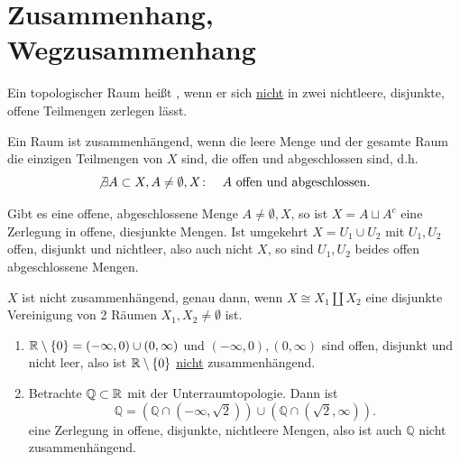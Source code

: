 
\section{Zusammenhang, Wegzusammenhang}

\begin{definition}[Zusammenhang]\label{def:zusammenhang}
    Ein topologischer Raum heißt , wenn er sich \underline{nicht} in zwei nichtleere, disjunkte, offene Teilmengen zerlegen lässt. 
\end{definition}

\begin{dlemma}\label{lm:raum-ist-zusammenhängend-gdw-offen-abgeschlossene-mengen-sind-trivial}
    Ein Raum ist zusammenhängend, wenn die leere Menge und der gesamte Raum die einzigen Teilmengen von $X$ sind, die offen und abgeschlossen sind, d.h.
     \[
    \not \exists  A\subset X, A\neq \emptyset,X \colon \quad A \text{ offen und abgeschlossen}
    .\] 
\end{dlemma}

\begin{proof*}
    Gibt es eine offene, abgeschlossene Menge $A\neq \emptyset,X$, so ist $X = A \sqcup A^{c}$ eine Zerlegung in offene, diesjunkte Mengen. Ist umgekehrt $X = U_1 \cup U_2$ mit $U_1,U_2$ offen, disjunkt und nichtleer, also auch nicht $X$, so sind $U_1,U_2$ beides offen abgeschlossene Mengen.
\end{proof*}

\begin{remark}
    $X$ ist nicht zusammenhängend, genau dann, wenn  $X \cong X_1 \coprod X_2$ eine disjunkte Vereinigung von 2 Räumen $X_1,X_2\neq \emptyset$ ist.
\end{remark}

\begin{example}
    \begin{enumerate}[1)]
        \item $\mathbb{R}\setminus \left \{0\right\}  = (-\infty,0) \cup (0,\infty)$ und $(-\infty,0),(0,\infty)$ sind offen, disjunkt und nicht leer, also ist $\mathbb{R}\setminus \left \{0\right\} $ \underline{nicht} zusammenhängend. 
        \item Betrachte $\mathbb{Q}\subset \mathbb{R}$ mit der Unterraumtopologie. Dann ist
            \[
                \mathbb{Q} = (\mathbb{Q} \cap (-\infty,\sqrt{2})) \cup (\mathbb{Q} \cap (\sqrt{2},\infty))  
            .\] 
            eine Zerlegung in offene, disjunkte, nichtleere Mengen, also ist auch $\mathbb{Q}$ nicht zusammenhängend.
    \end{enumerate}
\end{example}

